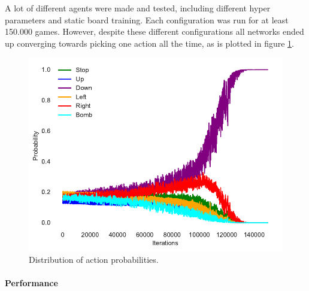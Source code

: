 A lot of different agents were made and tested, including different hyper parameters and static board training. Each configuration was run for at least 150.000 games. However, despite these different configurations all networks ended up converging towards picking one action all the time, as is plotted in figure \ref{fig:act}. 

\begin{figure}[htb]
    \centerline{\includegraphics[width=1.0\linewidth]{docs/article/inputs/a_probs.pdf}}
    \caption{Distribution of action probabilities.}\label{fig:act}
\end{figure}








\paragraph{Performance}

